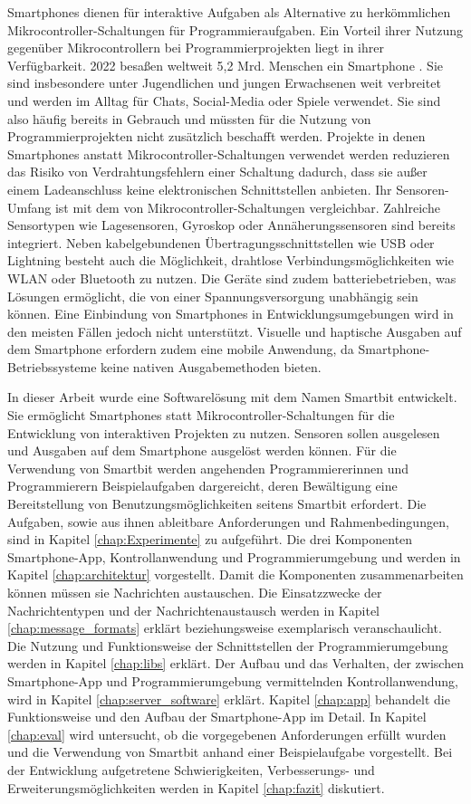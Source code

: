\documentclass[11pt,a4paper]{report}
\begin{document}
Smartphones dienen für interaktive Aufgaben als Alternative zu herkömmlichen Mikrocontroller-Schaltungen für Programmieraufgaben.
Ein Vorteil ihrer Nutzung gegenüber Mikrocontrollern bei Programmierprojekten liegt in ihrer Verfügbarkeit.
2022 besaßen weltweit 5,2 Mrd. Menschen ein Smartphone \cite{smartphone_users}.
Sie sind insbesondere unter Jugendlichen und jungen Erwachsenen weit verbreitet und werden im Alltag für Chats, Social-Media oder Spiele verwendet.
Sie sind also häufig bereits in Gebrauch und müssten für die Nutzung von Programmierprojekten nicht zusätzlich beschafft werden.
Projekte in denen Smartphones anstatt Mikrocontroller-Schaltungen verwendet werden reduzieren das Risiko von Verdrahtungsfehlern einer Schaltung dadurch, dass sie außer einem Ladeanschluss keine elektronischen Schnittstellen anbieten.
Ihr Sensoren-Umfang ist mit dem von Mikrocontroller-Schaltungen vergleichbar.
Zahlreiche Sensortypen wie Lagesensoren, Gyroskop oder Annäherungssensoren sind bereits integriert.
Neben kabelgebundenen Übertragungsschnittstellen wie USB oder Lightning besteht auch die Möglichkeit, drahtlose Verbindungsmöglichkeiten wie WLAN oder Bluetooth zu nutzen.
Die Geräte sind zudem batteriebetrieben, was Lösungen ermöglicht, die von einer Spannungsversorgung unabhängig sein können. 
Eine Einbindung von Smartphones in Entwicklungsumgebungen wird in den meisten Fällen jedoch nicht unterstützt.
Visuelle und haptische Ausgaben auf dem Smartphone erfordern zudem eine mobile Anwendung, da Smartphone-Betriebssysteme keine nativen Ausgabemethoden bieten.

In dieser Arbeit wurde eine Softwarelösung mit dem Namen Smartbit entwickelt.
Sie ermöglicht Smartphones statt Mikrocontroller-Schaltungen für die Entwicklung von interaktiven Projekten zu nutzen. 
Sensoren sollen ausgelesen und Ausgaben auf dem Smartphone ausgelöst werden können.
Für die Verwendung von Smartbit werden angehenden Programmiererinnen und Programmierern Beispielaufgaben dargereicht, deren Bewältigung eine Bereitstellung von Benutzungsmöglichkeiten seitens Smartbit erfordert.
Die Aufgaben, sowie aus ihnen ableitbare Anforderungen und Rahmenbedingungen, sind in Kapitel \ref{chap:Experimente} zu aufgeführt.
Die drei Komponenten Smartphone-App, Kontrollanwendung und Programmierumgebung und werden in Kapitel \ref{chap:architektur} vorgestellt.
Damit die Komponenten zusammenarbeiten können müssen sie Nachrichten austauschen.
Die Einsatzzwecke der Nachrichtentypen und der Nachrichtenaustausch werden in Kapitel \ref{chap:message_formats} erklärt beziehungsweise exemplarisch veranschaulicht.
Die Nutzung und Funktionsweise der Schnittstellen der Programmierumgebung werden in Kapitel \ref{chap:libs} erklärt.
Der Aufbau und das Verhalten, der zwischen Smartphone-App und Programmierumgebung vermittelnden Kontrollanwendung, wird in Kapitel \ref{chap:server_software} erklärt.
Kapitel \ref{chap:app} behandelt die Funktionsweise und den Aufbau der Smartphone-App im Detail.
In Kapitel \ref{chap:eval} wird untersucht, ob die vorgegebenen Anforderungen erfüllt wurden und die Verwendung von Smartbit anhand einer Beispielaufgabe vorgestellt.
Bei der Entwicklung aufgetretene Schwierigkeiten, Verbesserungs- und Erweiterungsmöglichkeiten werden in Kapitel \ref{chap:fazit} diskutiert.
\end{document}
